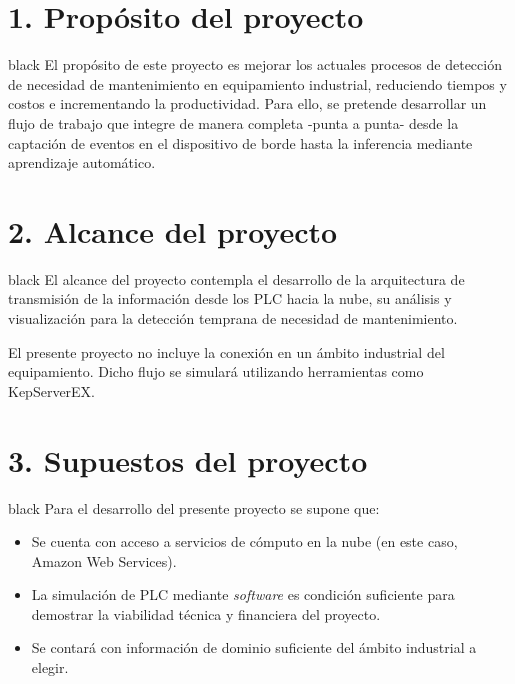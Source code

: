 \documentclass[11pt]{charter}
\begin{document}
\section{1. Propósito del proyecto}
\label{sec:proposito}

\begin{consigna}{black}
El propósito de este proyecto es mejorar los actuales procesos de detección de necesidad de mantenimiento en equipamiento industrial, reduciendo tiempos y costos e incrementando la productividad. Para ello, se pretende desarrollar un flujo de trabajo que integre de manera completa -punta a punta- desde la captación de eventos en el dispositivo de borde hasta la inferencia mediante aprendizaje automático.
\end{consigna}

\section{2. Alcance del proyecto}
\label{sec:alcance}

\begin{consigna}{black}
El alcance del proyecto contempla el desarrollo de la arquitectura de transmisión de la información desde los PLC hacia la nube, su análisis y visualización para la detección temprana de necesidad de mantenimiento. 

El presente proyecto no incluye la conexión en un ámbito industrial del equipamiento. Dicho flujo se simulará utilizando herramientas como KepServerEX.

\end{consigna}


\section{3. Supuestos del proyecto}
\label{sec:supuestos}

\begin{consigna}{black}
Para el desarrollo del presente proyecto se supone que:

\begin{itemize}
\item Se cuenta con acceso a servicios de cómputo en la nube (en este caso, Amazon Web Services).
\item La simulación de PLC mediante \textit{software} es condición suficiente para demostrar la viabilidad técnica y financiera del proyecto.
\item Se contará con información de dominio suficiente del ámbito industrial a elegir.
\end{itemize}

\end{consigna}
\end{document}
